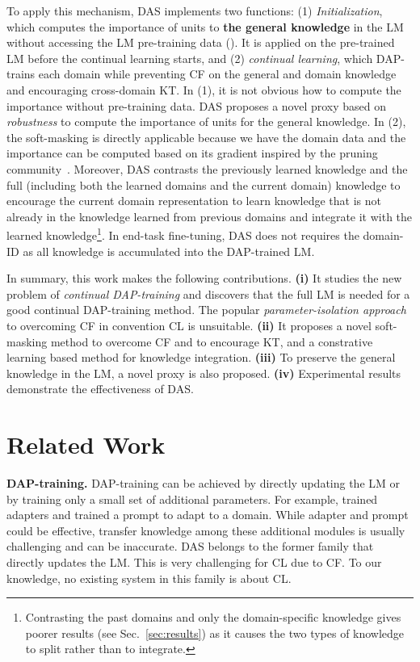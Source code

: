 \documentclass{article} \usepackage{iclr2023_conference,times}
\begin{document}
To apply this mechanism, DAS implements two functions: (1) \textit{Initialization}, which computes the importance of units to \textbf{the general knowledge} in the LM without accessing the LM pre-training data (). It is applied on the pre-trained LM before the continual learning starts, and (2) \textit{continual learning}, which DAP-trains each domain while preventing CF on the general and domain knowledge and encouraging cross-domain KT.
In (1), it is not obvious how to compute the importance without pre-training data. DAS proposes a novel proxy based on \textit{robustness} to compute the importance of units for the general knowledge. In (2), the soft-masking is directly applicable because we have the domain data and the importance can be computed based on its gradient inspired by the pruning community~\citep{li2021differentiable,michel2019sixteen}. Moreover, DAS contrasts the previously learned knowledge and the full (including both the learned domains and the current domain) knowledge to encourage the current domain representation to learn knowledge that is not already in the knowledge learned from previous domains and integrate it with the learned knowledge\footnote{Contrasting the past domains and only the domain-specific knowledge gives poorer results (see Sec.~\ref{sec:results}) as it causes the two types of knowledge to split rather than to integrate.}. In end-task fine-tuning, DAS does not requires the domain-ID as all knowledge is accumulated into the DAP-trained LM.






In summary, this work makes the following contributions. 
\textbf{(i)} It studies the new problem of \textit{continual DAP-training} and  
discovers that the full LM is needed for a good continual DAP-training method. The popular \textit{parameter-isolation approach} to overcoming CF in convention CL is unsuitable.
\textbf{(ii)} It proposes a novel soft-masking method to overcome CF and to encourage KT, and a constrative learning based method for knowledge integration.  \textbf{(iii)} To preserve the general knowledge in the LM, a novel proxy is also proposed.
\textbf{(iv)} Experimental results demonstrate the effectiveness of DAS. 

{\color{black}
\section{Related Work}
\label{sec:related}
\textbf{DAP-training.} DAP-training 
can be achieved by directly updating the LM \citep{DBLP:conf/naacl/XuLSY19,sun2019fine,lee2020biobert,alsentzer2019publicly,DBLP:conf/acl/GururanganMSLBD20,chakrabarty2019imho,ke2022dga} or by training only a small set of additional parameters. For example, \cite{pfeiffer2020adapterfusion,wang2020k,ke2021achieving,ke2021Classic,ke2021adapting} trained adapters and \cite{gu2021ppt} trained a prompt to adapt to a domain. While adapter and prompt could be effective, transfer knowledge among these additional modules is usually challenging and can be inaccurate. DAS belongs to the former family that directly updates the LM. This is very challenging for CL due to CF. To our knowledge, no existing system in this family is about CL. }
\end{document}
